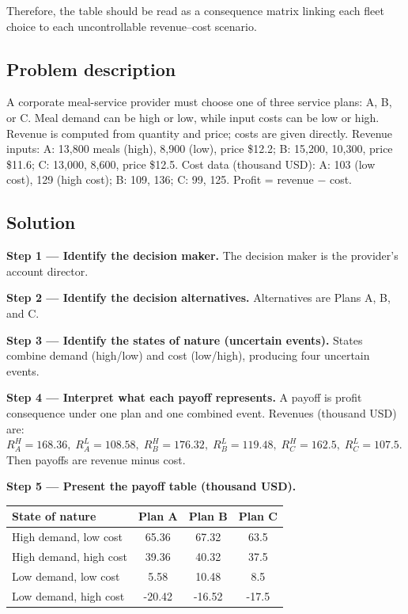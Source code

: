 \begin{ExamProblems}
		Therefore, the table should be read as a consequence matrix linking each fleet choice to each uncontrollable revenue--cost scenario.
		
		\item
		\subsection*{Problem description}
		A corporate meal-service provider must choose one of three service plans: A, B, or C.
		Meal demand can be high or low, while input costs can be low or high.
		Revenue is computed from quantity and price; costs are given directly.
		Revenue inputs:
		A: 13{,}800 meals (high), 8{,}900 (low), price \$12.2;
		B: 15{,}200, 10{,}300, price \$11.6;
		C: 13{,}000, 8{,}600, price \$12.5.
		Cost data (thousand USD):
		A: 103 (low cost), 129 (high cost);
		B: 109, 136;
		C: 99, 125.
		Profit = revenue $-$ cost.
		
		\subsection*{Solution}
		\textbf{Step 1 --- Identify the decision maker.} The decision maker is the provider's account director.
		
		\textbf{Step 2 --- Identify the decision alternatives.} Alternatives are Plans A, B, and C.
		
		\textbf{Step 3 --- Identify the states of nature (uncertain events).} States combine demand (high/low) and cost (low/high), producing four uncertain events.
		
		\textbf{Step 4 --- Interpret what each payoff represents.} A payoff is profit consequence under one plan and one combined event. Revenues (thousand USD) are:
		\(R_A^H=168.36,\;R_A^L=108.58,\;R_B^H=176.32,\;R_B^L=119.48,\;R_C^H=162.5,\;R_C^L=107.5\).
		Then payoffs are revenue minus cost.
		
		\textbf{Step 5 --- Present the payoff table (thousand USD).}
		\begin{center}
			\begin{tabular}{l c c c}
				\toprule
				State of nature & Plan A & Plan B & Plan C \\
				\midrule
				High demand, low cost & 65.36 & 67.32 & 63.5 \\
				High demand, high cost & 39.36 & 40.32 & 37.5 \\
				Low demand, low cost & 5.58 & 10.48 & 8.5 \\
				Low demand, high cost & -20.42 & -16.52 & -17.5 \\
				\bottomrule
			\end{tabular}
		\end{center}
		

\end{ExamProblems}
